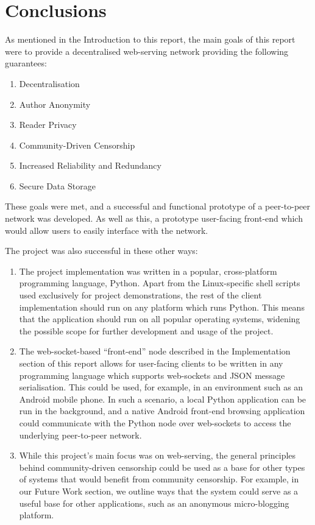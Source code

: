 \chapter{Conclusions}

As mentioned in the Introduction to this report, the main goals of this report were
to provide a decentralised web-serving network providing the following guarantees:

\begin{enumerate}
    \item{Decentralisation}
    \item{Author Anonymity}
    \item{Reader Privacy}
    \item{Community-Driven Censorship}
    \item{Increased Reliability and Redundancy}
    \item{Secure Data Storage}
\end{enumerate}

These goals were met, and a successful and functional prototype of a peer-to-peer
network was developed. As well as this, a prototype user-facing front-end which would allow
users to easily interface with the network.

The project was also successful in these other ways:

\begin{enumerate}
	\item { The project implementation was written in a popular, cross-platform programming
	language, Python. Apart from the Linux-specific shell scripts used exclusively for
	project demonstrations, the rest of the client implementation should run on any platform
	which runs Python. This means that the application should run on all popular operating systems,
	widening the possible scope for further development and usage of the project.
	}

	\item{ The web-socket-based ``front-end'' node described in the Implementation section of
	this report allows for user-facing clients to be written in any programming language
	which supports web-sockets and JSON message serialisation.
	This could be used, for example, in an environment such as an Android mobile phone. 
	In such a scenario,  a local Python application can be run
	in the background, and a native Android front-end browsing application could communicate with
	the Python node over web-sockets to access the underlying peer-to-peer network.
	}

    \item{ While this project's main focus was on web-serving, the general principles behind
            community-driven censorship could be used as a base for other types of systems
            that would benefit from community censorship. For example, in our Future Work section,
            we outline ways that the system could serve as a useful base for other applications,
            such as an anonymous micro-blogging platform.
                   }
\end{enumerate}

